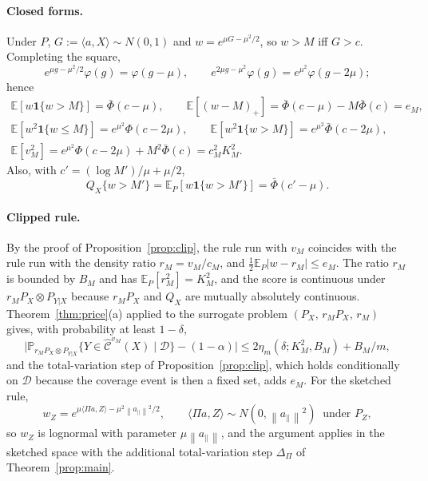 \documentclass[11pt,a4paper]{article}
\newcommand{\PX}{P_X}
\newcommand{\QX}{Q_X}
\newcommand{\norm}[1]{\left\|#1\right\|}
\newcommand{\E}{\mathbb{E}}
\newcommand{\Prob}{\mathbb{P}}
\newcommand{\Cset}{\widehat{\mathcal C}}
\newcommand{\ind}{\mathbf 1}
\theoremstyle{plain}
\theoremstyle{definition}
\theoremstyle{remark}
\begin{document}
\paragraph{Closed forms.} Under $P$, $G:=\langle a,X\rangle\sim N(0,1)$ and $w=e^{\mu G-\mu^2/2}$, so $w>M$ iff $G>c$. Completing the square,
\[
e^{\mu g-\mu^2/2}\varphi(g)=\varphi(g-\mu),\qquad e^{2\mu g-\mu^2}\varphi(g)=e^{\mu^2}\varphi(g-2\mu);
\]
hence
\begin{gather*}
\E[w\ind\{w>M\}]=\bar\Phi(c-\mu),\qquad
\E[(w-M)_+]=\bar\Phi(c-\mu)-M\bar\Phi(c)=e_M,\\
\E[w^2\ind\{w\le M\}]=e^{\mu^2}\Phi(c-2\mu),\qquad
\E[w^2\ind\{w>M\}]=e^{\mu^2}\bar\Phi(c-2\mu),\\
\E[v_M^2]=e^{\mu^2}\Phi(c-2\mu)+M^2\bar\Phi(c)=c_M^2K_M^2 .
\end{gather*}
Also, with $c'=(\log M')/\mu+\mu/2$,
\[
\QX\{w>M'\}=\E_P[w\ind\{w>M'\}]=\bar\Phi(c'-\mu).
\]

\paragraph{Clipped rule.} By the proof of Proposition~\ref{prop:clip}, the rule run with $v_M$ coincides with the rule run with the density ratio $r_M=v_M/c_M$, and $\tfrac12\E_P|w-r_M|\le e_M$. The ratio $r_M$ is bounded by $B_M$ and has $\E_P[r_M^2]=K_M^2$, and the score is continuous under $r_M\PX\otimes P_{Y|X}$ because $r_M\PX$ and $\QX$ are mutually absolutely continuous. Theorem~\ref{thm:price}(a) applied to the surrogate problem $(\PX,\,r_M\PX,\,r_M)$ gives, with probability at least $1-\delta$,
\[
\bigl|\Prob_{r_M\PX\otimes P_{Y|X}}\{Y\in\Cset^{v_M}(X)\mid\mathcal D\}-(1-\alpha)\bigr|\le2\eta_m(\delta;K_M^2,B_M)+B_M/m,
\]
and the total-variation step of Proposition~\ref{prop:clip}, which holds conditionally on $\mathcal D$ because the coverage event is then a fixed set, adds $e_M$. For the sketched rule,
\[
w_Z=e^{\mu\langle\Pi a,Z\rangle-\mu^2\norm{a_\parallel}^2/2},\qquad \langle\Pi a,Z\rangle\sim N(0,\norm{a_\parallel}^2)\ \text{ under }P_Z,
\]
so $w_Z$ is lognormal with parameter $\mu\norm{a_\parallel}$, and the argument applies in the sketched space with the additional total-variation step $\Delta_\Pi$ of Theorem~\ref{prop:main}.
\end{document}

